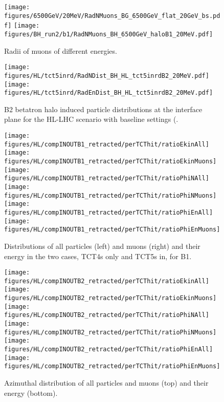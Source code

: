 \begin{figure}
\begin{center}
  \texttt{[image: figures/6500GeV/20MeV/RadNMuons\_BG\_6500GeV\_flat\_20GeV\_bs.pdf]}
  \texttt{[image: figures/BH\_run2/b1/RadNMuons\_BH\_6500GeV\_haloB1\_20MeV.pdf]}      
\end{center}
\vspace{-0.6cm}
 \caption{Radii of muons of different energies.
  \label{fig:PhiEnMuComp}}
\end{figure}


\begin{figure}
\begin{center}
\texttt{[image: figures/HL/tct5inrd/RadNDist\_BH\_HL\_tct5inrdB2\_20MeV.pdf]}
\texttt{[image: figures/HL/tct5inrd/RadEnDist\_BH\_HL\_tct5inrdB2\_20MeV.pdf]}
\end{center}
\vspace{-0.6cm}
 \caption{B2 betatron halo induced particle distributions at the interface plane for the HL-LHC scenario with baseline settings (.}
  \label{tct5inrdb2retr2}
\end{figure}



\begin{figure}
\centering
\texttt{[image: figures/HL/compINOUTB1\_retracted/perTCThit/ratioEkinAll]}
\texttt{[image: figures/HL/compINOUTB1\_retracted/perTCThit/ratioEkinMuons]}
\texttt{[image: figures/HL/compINOUTB1\_retracted/perTCThit/ratioPhiNAll]}
\texttt{[image: figures/HL/compINOUTB1\_retracted/perTCThit/ratioPhiNMuons]}
\texttt{[image: figures/HL/compINOUTB1\_retracted/perTCThit/ratioPhiEnAll]}
\texttt{[image: figures/HL/compINOUTB1\_retracted/perTCThit/ratioPhiEnMuons]}
 \caption{Distributions of all particles (left) and muons (right) and their energy in the two cases, TCT4s only and TCT5s in, for B1.
  \label{fig:compInOutB1_perTCThit}}
\end{figure}




\begin{figure}
\begin{center}
\texttt{[image: figures/HL/compINOUTB2\_retracted/perTCThit/ratioEkinAll]}
\texttt{[image: figures/HL/compINOUTB2\_retracted/perTCThit/ratioEkinMuons]}
\texttt{[image: figures/HL/compINOUTB2\_retracted/perTCThit/ratioPhiNAll]}
\texttt{[image: figures/HL/compINOUTB2\_retracted/perTCThit/ratioPhiNMuons]}
\texttt{[image: figures/HL/compINOUTB2\_retracted/perTCThit/ratioPhiEnAll]}
\texttt{[image: figures/HL/compINOUTB2\_retracted/perTCThit/ratioPhiEnMuons]}
\end{center}
\vspace{-0.6cm}
 \caption{Azimuthal distribution of all particles and muons (top) and their energy (bottom).
  \label{fig:compInOutB2}}
\end{figure}


